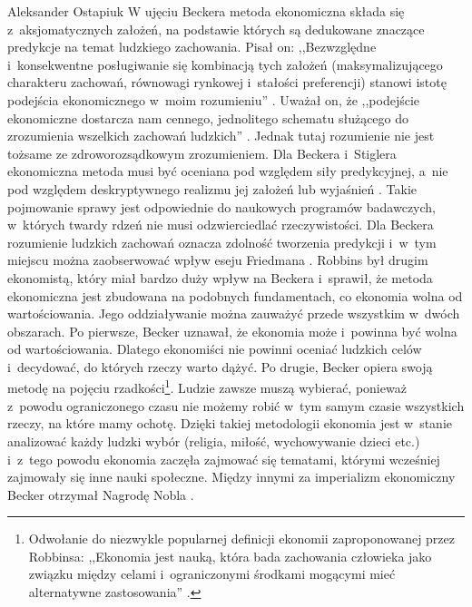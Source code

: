 \begin{artplenv}{Aleksander Ostapiuk}
W ujęciu Beckera metoda ekonomiczna składa się z~aksjomatycznych założeń, na podstawie których są dedukowane znaczące
predykcje na temat ludzkiego zachowania. Pisał on: ,,Bezwzględne i~konsekwentne posługiwanie się kombinacją tych założeń
(maksymalizującego charakteru zachowań, równowagi rynkowej i~stałości preferencji) stanowi istotę podejścia
ekonomicznego w~moim rozumieniu''
\parencite[s.~23]{becker_ekonomiczna_1990}.
Uważał on, że ,,podejście ekonomiczne
dostarcza nam cennego, jednolitego schematu służącego do zrozumienia wszelkich zachowań ludzkich''
\parencite[s.~38]{becker_ekonomiczna_1990}.
Jednak tutaj rozumienie nie jest tożsame ze zdroworozsądkowym
zrozumieniem. Dla Beckera i~Stiglera
\parencite*{becker_gustibus_1977}
ekonomiczna metoda musi być oceniana pod względem
siły predykcyjnej, a~nie pod względem deskryptywnego realizmu jej założeń lub wyjaśnień
\parencite[s.~402–403]{becker_economic_1993}.
Takie pojmowanie sprawy jest odpowiednie do naukowych programów
badawczych, w~których twardy rdzeń nie musi odzwierciedlać rzeczywistości. Dla Beckera rozumienie ludzkich zachowań
oznacza zdolność tworzenia predykcji i~w~tym miejscu można zaobserwować wpływ eseju Friedmana
\parencite*{friedman_essays_1953}.
Robbins był drugim ekonomistą, który miał bardzo duży wpływ na Beckera i~sprawił, że
metoda ekonomiczna jest zbudowana na podobnych fundamentach, co ekonomia wolna od wartościowania. Jego oddziaływanie
można zauważyć przede wszystkim w~dwóch obszarach. Po pierwsze, Becker uznawał, że ekonomia może i~powinna być wolna od
wartościowania. Dlatego ekonomiści nie powinni oceniać ludzkich celów i~decydować, do których rzeczy warto dążyć. Po
drugie, Becker opiera swoją metodę na pojęciu rzadkości\footnote{Odwołanie do niezwykle popularnej definicji ekonomii
zaproponowanej przez Robbinsa: ,,Ekonomia jest nauką, która bada zachowania człowieka jako związku między
celami i~ograniczonymi środkami mogącymi mieć alternatywne zastosowania''
\parencite[s.~15]{robbins_essay_1935}.
}.
Ludzie zawsze muszą wybierać, ponieważ z~powodu ograniczonego czasu nie możemy robić w~tym samym czasie wszystkich rzeczy,
na które mamy ochotę. Dzięki takiej metodologii ekonomia jest w~stanie analizować każdy ludzki wybór (religia, miłość,
wychowywanie dzieci etc.) i~z~tego powodu ekonomia zaczęła zajmować się tematami, którymi wcześniej zajmowały się inne
nauki społeczne. Między innymi za imperializm ekonomiczny Becker otrzymał Nagrodę Nobla
\parencite[s.~1]{noauthor_royal_1993}.


\end{artplenv}
